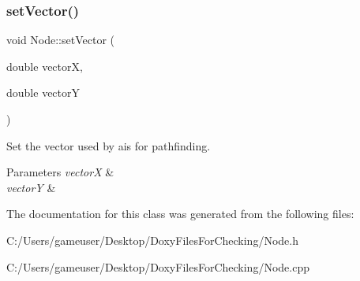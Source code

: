 \subsubsection{\texorpdfstring{setVector()}{setVector()}}
{\footnotesize\ttfamily void Node\+::set\+Vector (\begin{DoxyParamCaption}\item[{double}]{vectorX,  }\item[{double}]{vectorY }\end{DoxyParamCaption})}



Set the vector used by ais for pathfinding. 


\begin{DoxyParams}{Parameters}
{\em vectorX} & \\
\hline
{\em vectorY} & \\
\hline
\end{DoxyParams}


The documentation for this class was generated from the following files\+:\begin{DoxyCompactItemize}
\item 
C\+:/\+Users/gameuser/\+Desktop/\+Doxy\+Files\+For\+Checking/Node.\+h\item 
C\+:/\+Users/gameuser/\+Desktop/\+Doxy\+Files\+For\+Checking/Node.\+cpp\end{DoxyCompactItemize}
